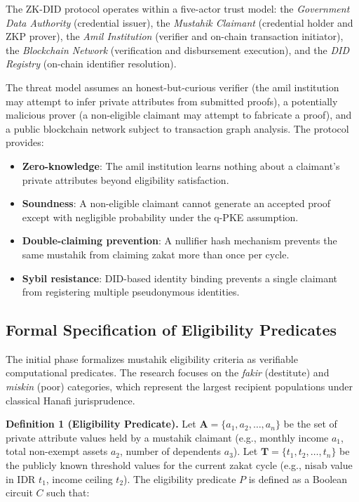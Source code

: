 \documentclass[conference]{IEEEtran}
\begin{document}
The ZK-DID protocol operates within a five-actor trust model: the \textit{Government Data Authority} (credential issuer), the \textit{Mustahik Claimant} (credential holder and ZKP prover), the \textit{Amil Institution} (verifier and on-chain transaction initiator), the \textit{Blockchain Network} (verification and disbursement execution), and the \textit{DID Registry} (on-chain identifier resolution).

The threat model assumes an honest-but-curious verifier (the amil institution may attempt to infer private attributes from submitted proofs), a potentially malicious prover (a non-eligible claimant may attempt to fabricate a proof), and a public blockchain network subject to transaction graph analysis. The protocol provides:

\begin{itemize}
    \item \textbf{Zero-knowledge}: The amil institution learns nothing about a claimant's private attributes beyond eligibility satisfaction.
    \item \textbf{Soundness}: A non-eligible claimant cannot generate an accepted proof except with negligible probability under the q-PKE assumption.
    \item \textbf{Double-claiming prevention}: A nullifier hash mechanism prevents the same mustahik from claiming zakat more than once per cycle.
    \item \textbf{Sybil resistance}: DID-based identity binding prevents a single claimant from registering multiple pseudonymous identities.
\end{itemize}

\subsection{Formal Specification of Eligibility Predicates}

The initial phase formalizes mustahik eligibility criteria as verifiable computational predicates. The research focuses on the \textit{fakir} (destitute) and \textit{miskin} (poor) categories, which represent the largest recipient populations under classical Hanafi jurisprudence.

\textbf{Definition 1 (Eligibility Predicate).} Let $\mathbf{A} = \{a_1, a_2, \ldots, a_n\}$ be the set of private attribute values held by a mustahik claimant (e.g., monthly income $a_1$, total non-exempt assets $a_2$, number of dependents $a_3$). Let $\mathbf{T} = \{t_1, t_2, \ldots, t_n\}$ be the publicly known threshold values for the current zakat cycle (e.g., nisab value in IDR $t_1$, income ceiling $t_2$). The eligibility predicate $P$ is defined as a Boolean circuit $C$ such that:
\end{document}
